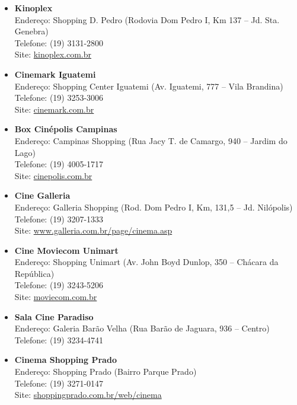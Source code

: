 \begin{itemize}
\item   \textbf{Kinoplex}
		\\Endereço: Shopping D. Pedro (Rodovia Dom Pedro I, Km 137 -- Jd. Sta. Genebra)
		\\Telefone: (19) 3131-2800
		\\Site: \url{kinoplex.com.br}

\item   \textbf{Cinemark Iguatemi}
		\\Endereço: Shopping Center Iguatemi (Av. Iguatemi, 777 -- Vila Brandina)
		\\Telefone: (19) 3253-3006
		\\Site: \url{cinemark.com.br}

\item   \textbf{Box Cinépolis Campinas}
		\\Endereço: Campinas Shopping (Rua Jacy T. de Camargo, 940 -- Jardim do Lago)
		\\Telefone: (19) 4005-1717
		\\Site: \url{cinepolis.com.br}

\item   \textbf{Cine Galleria}
		\\Endereço: Galleria Shopping (Rod. Dom Pedro I, Km, 131,5 -- Jd. Nilópolis)
		\\Telefone: (19) 3207-1333
		\\Site: \url{www.galleria.com.br/page/cinema.asp}

\item   \textbf{Cine Moviecom Unimart}
		\\Endereço: Shopping Unimart (Av. John Boyd Dunlop, 350 -- Chácara da República)
		\\Telefone: (19) 3243-5206
		\\Site: \url{moviecom.com.br}

\item   \textbf{Sala Cine Paradiso}
		\\Endereço: Galeria Barão Velha (Rua Barão de Jaguara, 936 -- Centro)
		\\Telefone: (19) 3234-4741

\item   \textbf{Cinema Shopping Prado}
		\\Endereço: Shopping Prado (Bairro Parque Prado)
        \\Telefone: (19) 3271-0147
		\\Site: \url{shoppingprado.com.br/web/cinema}
\end{itemize}

